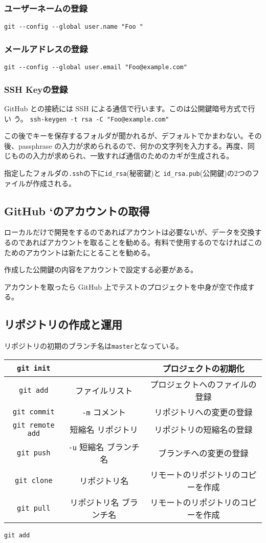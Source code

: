\subsubsection{ユーザーネームの登録}
\Verb+git --config --global user.name "Foo "+
\subsubsection{メールアドレスの登録}
\Verb+git --config --global user.email "Foo@example.com"+
\subsubsection{SSH Keyの登録}
GitHub との接続には SSH による通信で行います。このは公開鍵暗号方式で行い
う。
\Verb+ssh-keygen -t rsa -C "Foo@example.com"+

この後でキーを保存するフォルダが聞かれるが、デフォルトでかまわない。その
後、passphrase の入力が求められるので、何かの文字列を入力する。再度、同
じものの入力が求められ、一致すれば通信のためのカギが生成される。

指定したフォルダの\Verb+.ssh+の下に\Verb+id_rsa+(秘密鍵)と
\Verb+id_rsa.pub+(公開鍵)の2つのファイルが作成される。 

\subsection{GitHub ‘のアカウントの取得}
ローカルだけで開発をするのであればアカウントは必要ないが、データを交換す
るのであればアカウントを取ることを勧める。有料で使用するのでなければこの
ためのアカウントは新たにとることを勧める。

作成した公開鍵の内容をアカウントで設定する必要がある。

アカウントを取ったら GitHub 上でテストのプロジェクトを中身が空で作成する。


\subsection{リポジトリの作成と運用}
リポジトリの初期のブランチ名は\Verb+master+となっている。

\begin{tabular}{|c|c|c|}
\Verb+git init+ & &プロジェクトの初期化\\\hline
\Verb+git add+ & ファイルリスト&プロジェクトへのファイルの登録 \\\hline
\Verb+git commit+& \Verb+-m+ コメント& リポジトリへの変更の登録\\ \hline
\Verb+git remote add+ &短縮名 リポジトリ & リポジトリの短縮名の登録\\
 \hline
\Verb+git push+ &\Verb+-u+ 短縮名 ブランチ名 &ブランチへの変更の登録 \\ \hline
\Verb+git clone+ &リポジトリ名 &リモートのリポジトリのコピーを作成\\ \hline
\Verb+git pull+ &リポジトリ名 ブランチ名 &リモートのリポジトリのコピーを作成\\ \hline
\end{tabular}


\Verb+git add+ 
